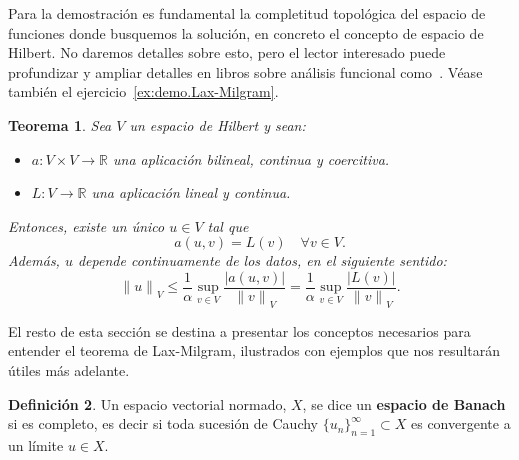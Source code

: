 \documentclass[11pt]{report}
\theoremstyle{plain}
\newtheorem{theorem}{Teorema}[chapter]
\theoremstyle{definition}
\newtheorem{definition}[theorem]{Definición}
\newcommand{\R}{\ensuremath{\mathbb{R}}}
\newcommand{\abs}[1]{\ensuremath{|#1|}}
\newcommand{\norm}[1]{\ensuremath{\|#1\|}}
\begin{document}
Para la demostración es fundamental la completitud topológica del espacio de funciones donde busquemos la solución, en concreto el concepto de espacio de Hilbert. No daremos detalles sobre esto, pero el lector interesado puede profundizar y ampliar detalles en libros sobre análisis funcional como~\cite{evans2010PDE,papageorgiou2018FunctionalAnalysis,stein2011FunctionalAnalysis,brezis:2017}. Véase también el ejercicio~\ref{ex:demo.Lax-Milgram}.

\begin{theorem}
  \label{th:Lax-Milgram}
  Sea $V$ un espacio de Hilbert y sean:
  \begin{itemize}
    \item $a:V\times V \to\R$ una aplicación bilineal, continua y coercitiva.
    \item $L:V\to\R$ una aplicación lineal y continua.
  \end{itemize}
  Entonces, existe un único $u\in V$ tal que 
  \begin{equation}
    \label{eq:formulacion.variational.generica}
    a(u,v) = L(v) \quad\forall v\in V.
  \end{equation}
Además, $u$ depende continuamente de los datos, en el siguiente sentido:
\begin{equation}
  \label{eq:continuidad.de.u}
  \norm{u}_{V} \le 
  \frac{1}{\alpha} \sup_{v\in V} \frac{\abs{a(u,v)}}{\norm{v}_{V}} = 
  \frac{1}{\alpha} \sup_{v\in V} \frac{|L(v)|}{\norm{v}_{V}}.
\end{equation}
\end{theorem}

El resto de esta sección se destina a presentar los conceptos necesarios para entender el teorema de Lax-Milgram, ilustrados con ejemplos que nos resultarán útiles más adelante.

\begin{definition}
  Un espacio vectorial normado, $X$, se dice un \textbf{espacio de Banach} si es completo, es decir si toda sucesión de Cauchy $\{u_n\}_{n=1}^\infty\subset X$ es convergente a un límite $u\in X$.
\end{definition}
\end{document}

